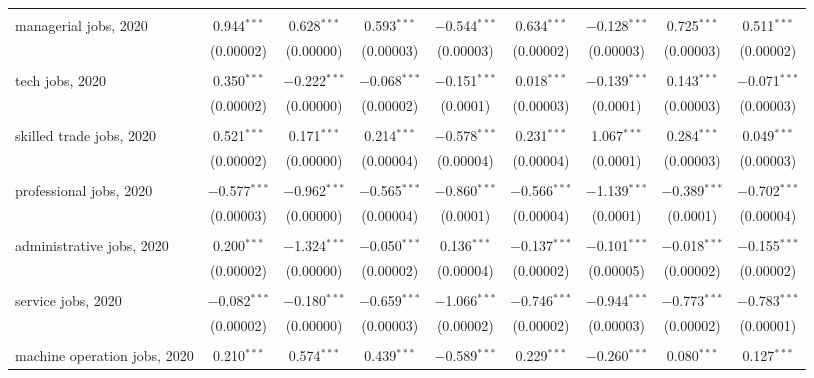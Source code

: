 \begin{sidewaystable}[!htbp]
\begin{tabular}{@{\extracolsep{5pt}}lcccccccc}
  & & & & & & & & \\ 
 managerial jobs, 2020 & 0.944$^{***}$ & 0.628$^{***}$ & 0.593$^{***}$ & $-$0.544$^{***}$ & 0.634$^{***}$ & $-$0.128$^{***}$ & 0.725$^{***}$ & 0.511$^{***}$ \\ 
  & (0.00002) & (0.00000) & (0.00003) & (0.00003) & (0.00002) & (0.00003) & (0.00003) & (0.00002) \\ 
  & & & & & & & & \\ 
 tech jobs, 2020 & 0.350$^{***}$ & $-$0.222$^{***}$ & $-$0.068$^{***}$ & $-$0.151$^{***}$ & 0.018$^{***}$ & $-$0.139$^{***}$ & 0.143$^{***}$ & $-$0.071$^{***}$ \\ 
  & (0.00002) & (0.00000) & (0.00002) & (0.0001) & (0.00003) & (0.0001) & (0.00003) & (0.00003) \\ 
  & & & & & & & & \\ 
 skilled trade jobs, 2020 & 0.521$^{***}$ & 0.171$^{***}$ & 0.214$^{***}$ & $-$0.578$^{***}$ & 0.231$^{***}$ & 1.067$^{***}$ & 0.284$^{***}$ & 0.049$^{***}$ \\ 
  & (0.00002) & (0.00000) & (0.00004) & (0.00004) & (0.00004) & (0.0001) & (0.00003) & (0.00003) \\ 
  & & & & & & & & \\ 
 professional jobs, 2020 & $-$0.577$^{***}$ & $-$0.962$^{***}$ & $-$0.565$^{***}$ & $-$0.860$^{***}$ & $-$0.566$^{***}$ & $-$1.139$^{***}$ & $-$0.389$^{***}$ & $-$0.702$^{***}$ \\ 
  & (0.00003) & (0.00000) & (0.00004) & (0.0001) & (0.00004) & (0.0001) & (0.0001) & (0.00004) \\ 
  & & & & & & & & \\ 
 administrative jobs, 2020 & 0.200$^{***}$ & $-$1.324$^{***}$ & $-$0.050$^{***}$ & 0.136$^{***}$ & $-$0.137$^{***}$ & $-$0.101$^{***}$ & $-$0.018$^{***}$ & $-$0.155$^{***}$ \\ 
  & (0.00002) & (0.00000) & (0.00002) & (0.00004) & (0.00002) & (0.00005) & (0.00002) & (0.00002) \\ 
  & & & & & & & & \\ 
 service jobs, 2020 & $-$0.082$^{***}$ & $-$0.180$^{***}$ & $-$0.659$^{***}$ & $-$1.066$^{***}$ & $-$0.746$^{***}$ & $-$0.944$^{***}$ & $-$0.773$^{***}$ & $-$0.783$^{***}$ \\ 
  & (0.00002) & (0.00000) & (0.00003) & (0.00002) & (0.00002) & (0.00003) & (0.00002) & (0.00001) \\ 
  & & & & & & & & \\ 
 machine operation jobs, 2020 & 0.210$^{***}$ & 0.574$^{***}$ & 0.439$^{***}$ & $-$0.589$^{***}$ & 0.229$^{***}$ & $-$0.260$^{***}$ & 0.080$^{***}$ & 0.127$^{***}$ \\ 

\end{tabular}
\end{sidewaystable}
